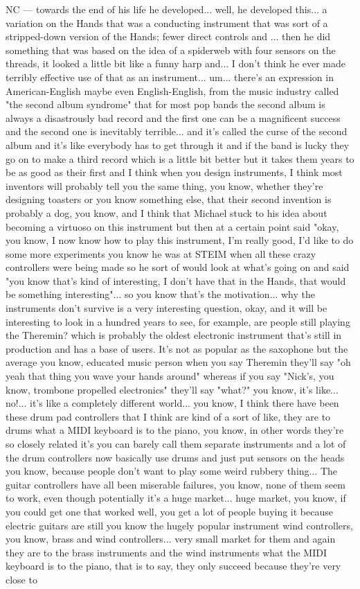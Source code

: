 NC — towards the end of his life he developed... well, he developed this... a variation on the Hands that was a conducting instrument that was sort of a stripped-down version of the Hands;  fewer direct controls and ... then he did something that was based on the idea of a spiderweb with four sensors on the threads, it looked a little bit like a funny harp and... I don't think he ever made terribly effective use of that as an instrument... um... there's an expression in American-English maybe even English-English, from the music industry called "the second album syndrome" that for most pop bands the second album is always a disastrously bad record and the first one can be a magnificent success and  the second one is inevitably terrible... and it's called the curse of the second album  and it's like everybody has to get through it and if the band is lucky they go on to make a third record which is a little bit better but it takes them years to be as good as their first and I think when you design instruments, I think most inventors will probably tell you the same thing, you know, whether they're designing toasters or you know something else, that their second invention is probably a dog, you know, and I think that Michael stuck to his idea about becoming a virtuoso on this instrument but then at a certain point said "okay, you know, I now know how to play this instrument, I'm really good, I'd like to do some more experiments you know he was at STEIM when all these crazy controllers were being made so he sort of would look at what's going on and said "you know that's kind of interesting, I don't have that in the Hands, that would be something interesting"... so you know that's the motivation... why the instruments don't survive is a very interesting question, okay, and it will be interesting to look in a hundred years to see, for example, are people still playing the Theremin? which is probably the oldest electronic instrument that's still in production and has a base of users. It's not as popular as the saxophone but the average you know, educated music person when you say Theremin they'll say "oh yeah that thing you wave your hands around" whereas if you say "Nick's, you know, trombone propelled electronics" they'll say "what?" you know, it's like... no!... it's like a completely different world... you know, I think there have been these drum pad controllers that I think are kind of a sort of like, they are to drums what a MIDI keyboard is to the piano, you know, in other words they're so closely related it's you can barely call them separate instruments and a lot of the drum controllers now basically use drums and just put sensors on the heads you know, because people don't want to play some weird rubbery thing... The guitar controllers have all been miserable failures, you know, none of them seem to work, even though potentially it's a huge market... huge market, you know, if you could get one that worked well, you get a lot of people buying it because electric guitars are still you know the hugely popular instrument wind controllers, you know, brass and wind controllers... very small market for them and again they are to the brass instruments and the wind instruments what the MIDI keyboard is to the piano, that is to say, they only succeed because they're very close to 